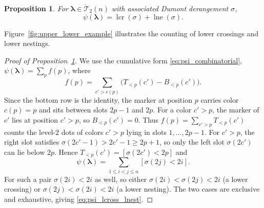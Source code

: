 \documentclass[pdftex]{sigma}
\numberwithin{equation}{section}
\newtheorem{Proposition}[Theorem]{Proposition}
\theoremstyle{definition}
\begin{document}
\begin{Proposition}
	\label{prop:psi_crossings_nestings}
	For $\boldsymbol\lambda\in\mathring{\mathcal{T}}_2(n)$ with associated
	Dumont derangement $\sigma$,
	\begin{equation}
		\label{eq:psi_lcross_lnest}
		\psi(\boldsymbol\lambda)=
		\operatorname{lcr}(\sigma)+\operatorname{lne}(\sigma).
	\end{equation}
\end{Proposition}
Figure~\ref{fig:upper_lower_example} illustrates the counting of lower
crossings and lower nestings.
\begin{proof}[Proof of Proposition~\ref{prop:psi_crossings_nestings}]
	We use the cumulative form \eqref{eq:psi_combinatorial},
	$\psi(\boldsymbol\lambda)=\sum_p f(p)$, where
	\[
		f(p)=\sum_{c'>c(p)}\bigl(T_{<p}(c')-B_{<p}(c')\bigr).
	\]
	Since the bottom row is the identity, the marker at position $p$
	carries color $c(p)=p$ and sits between slots $2p-1$ and $2p$. For a
	color $c'>p$, the marker of $c'$ lies at position $c'>p$, so
	$B_{<p}(c')=0$.
	Thus $f(p)=\sum_{c'>p}T_{<p}(c')$ counts the level-$2$ dots of colors
	$c'>p$ lying in slots $1,\dots,2p-1$.
	For $c'>p$, the right slot satisfies $\sigma(2c'-1)>2c'-1\ge 2p+1$, so
	only the left slot $\sigma(2c')$ can lie below $2p$. Hence
	$T_{<p}(c')= [ \sigma(2c')<2p ]$ and
	\begin{equation*}
		\psi(\boldsymbol\lambda)
		=\sum_{1\le i<j\le n} [ \sigma(2j)<2i ].
	\end{equation*}
	For such a pair $\sigma(2i)<2i$ as well, so either
	$\sigma(2i)<\sigma(2j)<2i$ (a lower crossing) or
	$\sigma(2j)<\sigma(2i)<2i$ (a lower nesting). The two cases are
	exclusive and exhaustive, giving \eqref{eq:psi_lcross_lnest}.
\end{proof}
\end{document}

